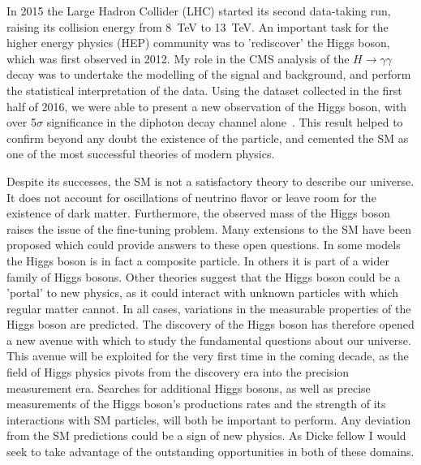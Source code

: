 \documentclass[11pt,a4paper,sans]{moderncv}        %
\begin{document}
\recipient{}{}
\date{\today}
\opening{}
\closing{}
\makelettertitle

In 2015 the Large Hadron Collider (LHC) started its second data-taking run, raising its collision energy from 8~TeV to 13~TeV. An important task for the higher energy physics (HEP) community was to 'rediscover' the Higgs boson, which was first observed in 2012. My role in the CMS analysis of the  $H \rightarrow \gamma \gamma$ decay was to undertake the modelling of the signal and background, and perform the statistical interpretation of the data. Using the dataset collected in the first half of 2016, we were able to present a new observation of the Higgs boson, with over 5$\sigma$ significance in the diphoton decay channel alone~\cite{PAS-HIG-16-020}. This result helped to confirm beyond any doubt the existence of the particle, and cemented the SM as one of the most successful theories of modern physics.


Despite its successes, the SM is not a satisfactory theory to describe our universe. It does not account for oscillations of neutrino flavor or leave room for the existence of dark matter. Furthermore, the observed mass of the Higgs boson raises the issue of the fine-tuning problem. Many extensions to the SM have been proposed which could provide answers to these open questions. In some models the Higgs boson is in fact a composite particle. In others it is part of a wider family of Higgs bosons. Other theories suggest that the Higgs boson could be a 'portal' to new physics, as it could interact with unknown particles with which regular matter cannot. In all cases, variations in the measurable properties of the Higgs boson are predicted. The discovery of the Higgs boson has therefore opened a new avenue with which to study the fundamental questions about our universe. This avenue will be exploited for the very first time in the coming decade, as the field of Higgs physics pivots from the discovery era into the precision measurement era. Searches for additional Higgs bosons, as well as precise measurements of the Higgs boson's productions rates and the strength of its interactions with SM particles, will both be important to perform. Any deviation from the SM predictions could be a sign of new physics. As Dicke fellow I would seek to take advantage of the outstanding opportunities in both of these domains.
\end{document}
